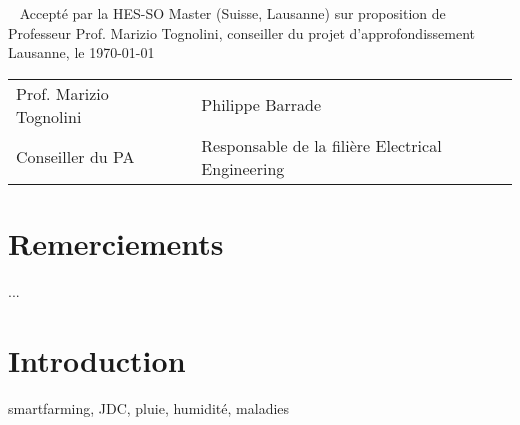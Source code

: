 \documentclass[a4paper, french, 10pt]{article} %
\newcommand{\prof}{Prof. Marizio Tognolini}
\begin{document}


\newpage
\thispagestyle{empty}
\
\newpage
\thispagestyle{empty}
Accepté par la HES-SO Master (Suisse, Lausanne) sur proposition de\\[10pt]
Professeur \prof, conseiller du projet d'approfondissement\\[30pt]
Lausanne, le \today\\[40pt]

\begin{tabular}{lll}
\prof & \hspace{4cm} & Philippe Barrade\\
Conseiller du PA & \hspace{4cm} & Responsable de la filière Electrical Engineering\\
\end{tabular}

\newpage
\thispagestyle{empty}
\section*{Remerciements}
...

\newpage
\thispagestyle{empty}
\tableofcontents

\newpage

\section{Introduction}
smartfarming, JDC, pluie, humidité, maladies








\end{document}
